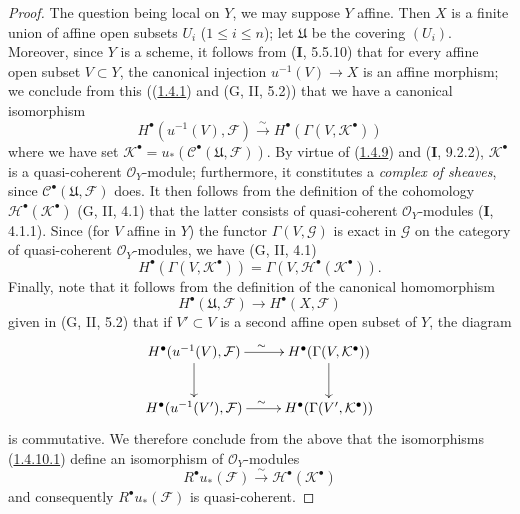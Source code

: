 \begin{proof}
The question being local on $Y$, we may suppose $Y$ affine. Then $X$ is a
finite union of affine open subsets $U_i$ ($1\leq i\leq n$); let
$\mathfrak U$ be the covering $(U_i)$. Moreover, since $Y$ is a scheme,
it follows from (\textbf{I}, 5.5.10) that for every affine open subset $V\subset Y$,
the canonical injection $u^{-1}(V)\to X$ is an affine morphism; we
conclude from this ((\hyperref[III.1.4.1]{1.4.1}) and (G, II, 5.2)) that
we have a canonical isomorphism
\begin{equation}
\label{III.1.4.10.1}
\tag{1.4.10.1}
H^\bullet(u^{-1}(V),\mathcal F)
\xrightarrow{\sim}H^\bullet(\Gamma(V,\mathcal K^\bullet))
\end{equation}
where we have set
$\mathcal K^\bullet=u_*(\mathcal C^\bullet(\mathfrak U,\mathcal F))$. By
virtue of (\hyperref[III.1.4.9]{1.4.9}) and (\textbf{I}, 9.2.2),
$\mathcal K^\bullet$ is a quasi-coherent $\mathcal O_Y$-module; furthermore,
it constitutes a \emph{complex of sheaves}, since
$\mathcal C^\bullet(\mathfrak U,\mathcal F)$ does. It then follows from the
definition of the cohomology
$\mathcal H^\bullet(\mathcal K^\bullet)$ (G, II, 4.1) that the latter
consists of quasi-coherent $\mathcal O_Y$-modules (\textbf{I}, 4.1.1). Since (for $V$
affine in $Y$) the functor $\Gamma(V,\mathcal G)$ is exact in
$\mathcal G$ on the category of quasi-coherent $\mathcal O_Y$-modules,
we have (G, II, 4.1)
\begin{equation}
\label{III.1.4.10.2}
\tag{1.4.10.2}
H^\bullet(\Gamma(V,\mathcal K^\bullet))
=\Gamma(V,\mathcal H^\bullet(\mathcal K^\bullet)).
\end{equation}
Finally, note that it follows from the definition of the canonical
homomorphism
\[
H^\bullet(\mathfrak U,\mathcal F)\longrightarrow H^\bullet(X,\mathcal F)
\]
given in (G, II, 5.2) that if $V'\subset V$ is a second affine open subset
of $Y$, the diagram
\[
\xymatrix{
H^\bullet(u^{-1}(V),\mathcal F)\ar[r]^{\sim}\ar[d]
&H^\bullet(\Gamma(V,\mathcal K^\bullet))\ar[d]\\
H^\bullet(u^{-1}(V'),\mathcal F)\ar[r]^{\sim}
&H^\bullet(\Gamma(V',\mathcal K^\bullet))
}
\]
is commutative. We therefore conclude from the above that the isomorphisms
(\hyperref[III.1.4.10.1]{1.4.10.1}) define an isomorphism of
$\mathcal O_Y$-modules
\begin{equation}
\label{III.1.4.10.3}
\tag{1.4.10.3}
R^\bullet u_*(\mathcal F)
\xrightarrow{\sim}\mathcal H^\bullet(\mathcal K^\bullet)
\end{equation}
and consequently $R^\bullet u_*(\mathcal F)$ is quasi-coherent.
\end{proof}

